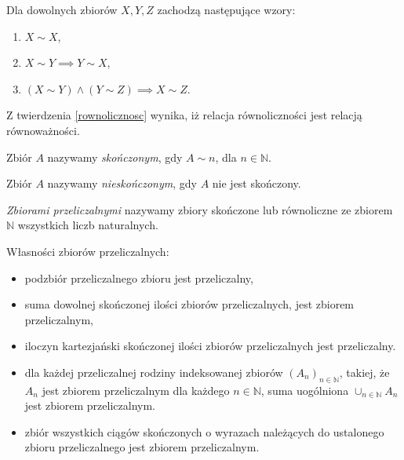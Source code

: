 	\begin{tw}\label{rownolicznosc}
		Dla dowolnych zbiorów $X,Y,Z$ zachodzą następujące wzory:
		\begin{enumerate}
			\item $X \sim X$,
			\item $X \sim Y \implies Y \sim X$,
			\item $(X \sim Y) \wedge (Y \sim Z) \implies X \sim Z$.
		\end{enumerate}
	\end{tw}	

	\begin{uwg}
		Z twierdzenia \ref{rownolicznosc} wynika, iż relacja równoliczności jest relacją równoważności.
	\end{uwg}
	
	\begin{df}
		Zbiór $A$ nazywamy \textit{skończonym}, gdy $A \sim n$, dla $n \in \mathbb{N}$.
	\end{df}
	
	\begin{df}
		Zbiór $A$ nazywamy \textit{nieskończonym}, gdy $A$ nie jest skończony.
	\end{df}
	
	\begin{df}
		\textit{Zbiorami przeliczalnymi} nazywamy zbiory skończone lub równoliczne ze zbiorem $\mathbb{N}$ wszystkich liczb naturalnych.
	\end{df}
	
	\begin{lem}
		Własności zbiorów przeliczalnych:
		\begin{itemize}
			\item podzbiór przeliczalnego zbioru jest przeliczalny,
			\item suma dowolnej skończonej ilości zbiorów przeliczalnych, jest zbiorem przeliczalnym,
			\item iloczyn kartezjański skończonej ilości zbiorów przeliczalnych jest przeliczalny.
			\item dla każdej przeliczalnej rodziny indeksowanej zbiorów $(A_n)_{n \in \mathbb{N}}$, takiej, że $A_n$ jest zbiorem przeliczalnym dla każdego $n \in \mathbb{N}$, suma uogólniona $\cup_{n \in \mathbb{N}} A_n$ jest zbiorem przeliczalnym.
			\item zbiór wszystkich ciągów skończonych o wyrazach należących do ustalonego zbioru przeliczalnego jest zbiorem przeliczalnym.
		\end{itemize}	
	\end{lem}
	
